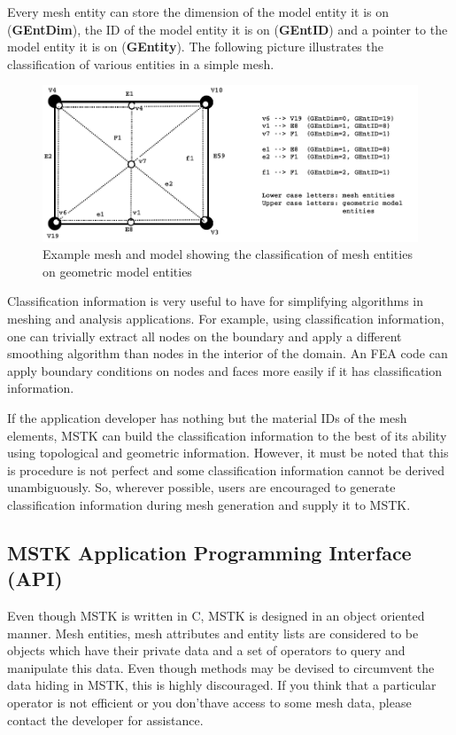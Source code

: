 \documentclass[12pt]{article}
\begin{document}
Every mesh entity can store the dimension of the model entity it is on
({\bf GEntDim}), the ID of the model entity it is on ({\bf GEntID})
and a pointer to the model entity it is on ({\bf GEntity}). The
following picture illustrates the classification of various entities
in a simple mesh.

\begin{figure}
  \begin{center}
    \includegraphics[width=\textwidth]{figures/classfn}
  \end{center}
  \caption{Example mesh and model showing the classification of mesh entities on geometric model entities}
\end{figure}

Classification information is very useful to have for simplifying
algorithms in meshing and analysis applications. For example, using
classification information, one can trivially extract all nodes on the
boundary and apply a different smoothing algorithm than nodes in the
interior of the domain. An FEA code can apply boundary conditions on
nodes and faces more easily if it has classification information.

If the application developer has nothing but the material IDs of the
mesh elements, MSTK can build the classification information to the
best of its ability using topological and geometric
information. However, it must be noted that this is procedure is not
perfect and some classification information cannot be derived
unambiguously. So, wherever possible, users are encouraged to generate
classification information during mesh generation and supply it to
MSTK.

\subsection{MSTK Application Programming Interface (API)}

Even though MSTK is written in C, MSTK is designed in an object
oriented manner. Mesh entities, mesh attributes and entity lists are
considered to be objects which have their private data and a set of
operators to query and manipulate this data. Even though methods may
be devised to circumvent the data hiding in MSTK, this is highly
discouraged. If you think that a particular operator is not efficient
or you don'thave access to some mesh data, please contact the
developer for assistance.
\end{document}
